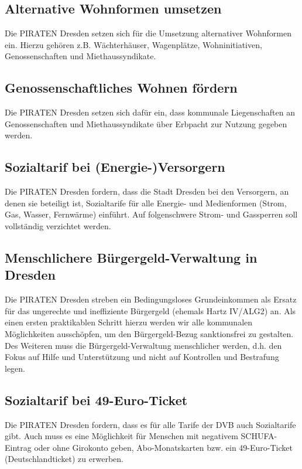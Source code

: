 \documentclass[a4paper, 11pt]{article}
\begin{document}
\subsection{Alternative Wohnformen umsetzen}
Die PIRATEN Dresden setzen sich für die Umsetzung alternativer Wohnformen ein. Hierzu gehören z.B. Wächterhäuser, Wagenplätze, Wohninitiativen, Genossenschaften und Miethaussyndikate.


\subsection{Genossenschaftliches Wohnen fördern}
Die PIRATEN Dresden setzen sich dafür ein, dass kommunale Liegenschaften an Genossenschaften und Miethaussyndikate über Erbpacht zur Nutzung gegeben werden.


\subsection{Sozialtarif bei (Energie-)Versorgern}
Die PIRATEN Dresden fordern, dass die Stadt Dresden bei den Versorgern, an denen sie beteiligt ist, Sozialtarife für alle Energie- und Medienformen (Strom, Gas, Wasser, Fernwärme) einführt. Auf folgenschwere Strom- und Gassperren soll vollständig verzichtet werden.




\subsection{Menschlichere Bürgergeld-Verwaltung in Dresden}
Die PIRATEN Dresden streben ein Bedingungsloses Grundeinkommen als Ersatz für das ungerechte und ineffiziente Bürgergeld (ehemals Hartz IV/ALG2) an. Als einen ersten praktikablen Schritt hierzu werden wir alle kommunalen Möglichkeiten ausschöpfen, um den Bürgergeld-Bezug sanktionsfrei zu gestalten. Des Weiteren muss die Bürgergeld-Verwaltung menschlicher werden, d.h. den Fokus auf Hilfe und Unterstützung und nicht auf Kontrollen und Bestrafung legen.


\subsection{Sozialtarif bei 49-Euro-Ticket}
Die PIRATEN Dresden fordern, dass es für alle Tarife der DVB auch Sozialtarife gibt. Auch muss es eine Möglichkeit für Menschen mit negativem SCHUFA-Eintrag oder ohne Girokonto geben, Abo-Monatskarten bzw. ein 49-Euro-Ticket (Deutschlandticket) zu erwerben.
\end{document}

